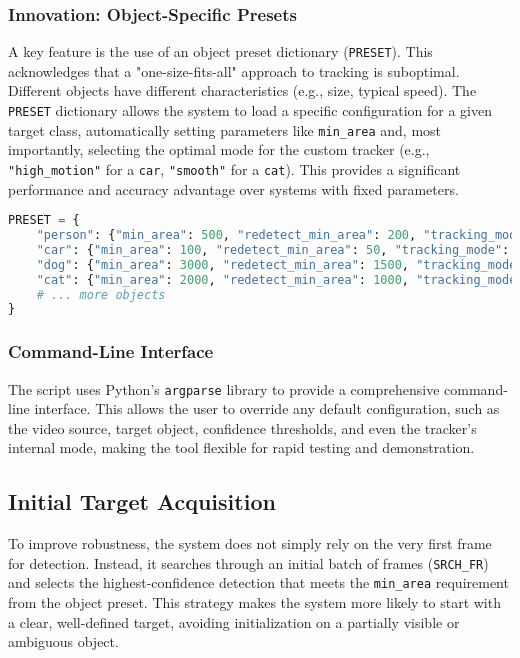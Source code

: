 \documentclass[12pt, a4paper]{article}
\begin{document}
\subsubsection{Innovation: Object-Specific Presets}
A key feature is the use of an object preset dictionary (\lstinline!PRESET!). This acknowledges that a "one-size-fits-all" approach to tracking is suboptimal. Different objects have different characteristics (e.g., size, typical speed). The \lstinline!PRESET! dictionary allows the system to load a specific configuration for a given target class, automatically setting parameters like \lstinline!min_area! and, most importantly, selecting the optimal mode for the custom tracker (e.g., \lstinline!"high_motion"! for a \lstinline!car!, \lstinline!"smooth"! for a \lstinline!cat!). This provides a significant performance and accuracy advantage over systems with fixed parameters.

\begin{lstlisting}[language=Python, caption={Object-specific configuration presets.}, label={lst:presets}]
PRESET = {
    "person": {"min_area": 500, "redetect_min_area": 200, "tracking_mode": "normal"},
    "car": {"min_area": 100, "redetect_min_area": 50, "tracking_mode": "high_motion"},
    "dog": {"min_area": 3000, "redetect_min_area": 1500, "tracking_mode": "high_motion"},
    "cat": {"min_area": 2000, "redetect_min_area": 1000, "tracking_mode": "smooth"},
    # ... more objects
}
\end{lstlisting}

\subsubsection{Command-Line Interface}
The script uses Python's \texttt{argparse} library to provide a comprehensive command-line interface. This allows the user to override any default configuration, such as the video source, target object, confidence thresholds, and even the tracker's internal mode, making the tool flexible for rapid testing and demonstration.

\subsection{Initial Target Acquisition}
To improve robustness, the system does not simply rely on the very first frame for detection. Instead, it searches through an initial batch of frames (\lstinline!SRCH_FR!) and selects the highest-confidence detection that meets the \lstinline!min_area! requirement from the object preset. This strategy makes the system more likely to start with a clear, well-defined target, avoiding initialization on a partially visible or ambiguous object.
\end{document}
